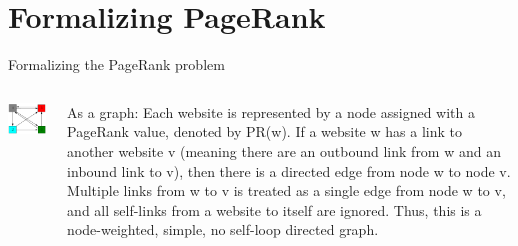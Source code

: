 \documentclass{beamer}
\begin{document}
\section{Formalizing PageRank}
\begin{frame}[t]{Formalizing the PageRank problem}
\begin{outline}
    \begin{columns}
        \begin{column}{0.5\textwidth}
            \includegraphics[width=\textwidth]{unweighted.png}
        \end{column}
        \begin{column}{0.5\textwidth}
            As a graph: Each website is represented by a node assigned with a PageRank value, denoted by PR(w). If a website w has a link to another website v (meaning there are an outbound link from w and an inbound link to v), then there is a directed edge from node w to node v. Multiple links from w to v is treated as a single edge from node w to v, and all self-links from a website to itself are ignored. Thus, this is a node-weighted, simple, no self-loop directed graph.
        \end{column}
    \end{columns}
\end{outline}
\end{frame}
\end{document}
